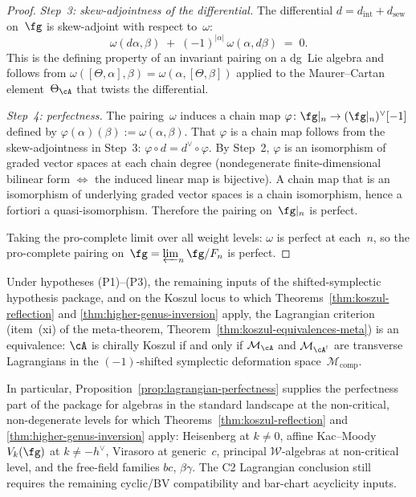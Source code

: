 \begin{proof}
\smallskip\noindent
\emph{Step~3: skew-adjointness of the differential.}
The differential $d = d_{\mathrm{int}} + d_{\mathrm{sew}}$
on~$\fg$ is skew-adjoint with respect to~$\omega$:
\[
\omega(d\alpha, \beta)
\;+\; (-1)^{|\alpha|}\,\omega(\alpha, d\beta)
\;=\; 0.
\]
This is the defining property of an invariant pairing on a
dg~Lie algebra and follows from
$\omega([\Theta, \alpha], \beta)
= \omega(\alpha, [\Theta, \beta])$
applied to the Maurer--Cartan element~$\Theta_\cA$ that
twists the differential.

\smallskip\noindent
\emph{Step~4: perfectness.}
The pairing~$\omega$ induces a chain map
$\varphi \colon \fg|_n \to (\fg|_n)^\vee[-1]$
defined by $\varphi(\alpha)(\beta) := \omega(\alpha, \beta)$.
That $\varphi$ is a chain map follows from the
skew-adjointness in Step~3: $\varphi \circ d = d^\vee \circ \varphi$.
By Step~2, $\varphi$ is an isomorphism of graded vector spaces
at each chain degree (nondegenerate finite-dimensional bilinear
form $\Leftrightarrow$ the induced linear map is bijective).
A chain map that is an isomorphism of underlying graded vector
spaces is a chain isomorphism, hence a fortiori a
quasi-isomorphism. Therefore the pairing on~$\fg|_n$ is perfect.

Taking the pro-complete limit over all weight levels:
$\omega$ is perfect at each~$n$, so the pro-complete
pairing on~$\fg = \varprojlim_n \fg/F_n$ is perfect.
\end{proof}

\begin{corollary}
\label{cor:lagrangian-conditional-standard-landscape}
\ClaimStatusConditional
{}
Under hypotheses \textup{(P1)--(P3)}, the remaining inputs of the
shifted-symplectic hypothesis package, and on the Koszul locus to
which Theorems~\ref{thm:koszul-reflection} and
\ref{thm:higher-genus-inversion} apply, the Lagrangian criterion
\textup{(}item~\textup{(xi)} of the meta-theorem,
Theorem~\textup{\ref{thm:koszul-equivalences-meta})} is an
equivalence: $\cA$ is chirally Koszul if and only if
$\mathcal{M}_\cA$ and $\mathcal{M}_{\cA^!}$ are transverse
Lagrangians in the $(-1)$-shifted symplectic deformation
space~$\mathcal{M}_{\mathrm{comp}}$.

In particular, Proposition~\ref{prop:lagrangian-perfectness} supplies
the perfectness part of the package for algebras in the standard
landscape at the non-critical, non-degenerate levels for which
Theorems~\ref{thm:koszul-reflection} and
\ref{thm:higher-genus-inversion} apply:
Heisenberg at $k \neq 0$, affine Kac--Moody $V_k(\fg)$ at
$k \neq -h^\vee$, Virasoro at generic~$c$, principal
$\mathcal{W}$-algebras at non-critical level, and the free-field
families $bc$, $\beta\gamma$. The C2 Lagrangian conclusion still
requires the remaining cyclic/BV compatibility and bar-chart
acyclicity inputs.
\end{corollary}

